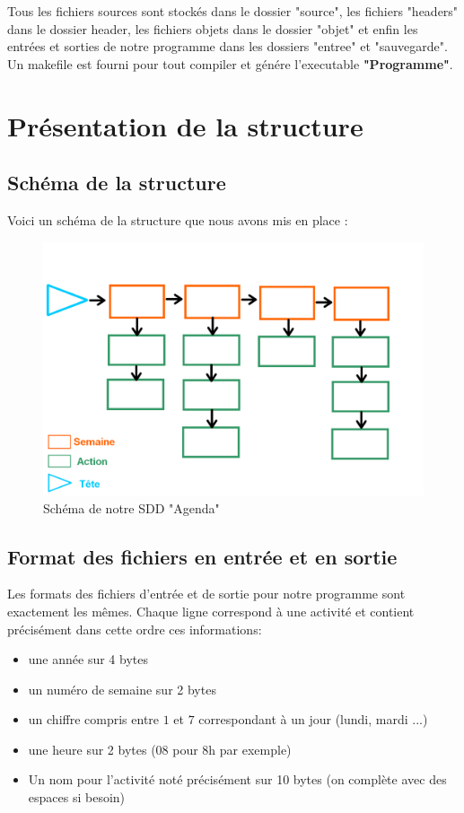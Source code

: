 \documentclass[12pt,french]{article} %
\begin{document}
Tous les fichiers sources sont stockés dans le dossier "source", les fichiers "headers" dans le dossier header, les fichiers objets dans le dossier "objet" et enfin les entrées et sorties de notre programme dans les dossiers "entree" et "sauvegarde".
Un makefile est fourni pour tout compiler et génére l'executable \textbf{"Programme"}.

\section{Présentation de la structure}
\subsection{Schéma de la structure}

Voici un schéma de la structure que nous avons mis en place :

\begin{figure}[H]
	\includegraphics[scale=0.45]{structure.png}
	\centering
	\caption{Schéma de notre SDD "Agenda"}
\end{figure}



\subsection{Format des fichiers en entrée et en sortie}

Les formats des fichiers d'entrée et de sortie pour notre programme sont exactement les mêmes. Chaque ligne correspond à une activité et contient précisément dans cette ordre ces informations:

\begin{itemize}
	\item une année sur 4 bytes
	\item un numéro de semaine sur 2 bytes
	\item un chiffre compris entre $1$ et $7$ correspondant à un jour (lundi, mardi ...)
	\item une heure sur 2 bytes (08 pour 8h par exemple)
	\item Un nom pour l'activité noté précisément sur 10 bytes (on complète avec des espaces si besoin) \newline
\end{itemize}
\end{document}
